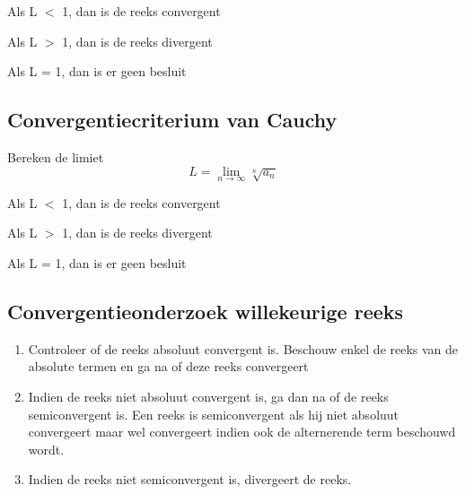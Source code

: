 \documentclass{report}
\begin{document}
Als L $<$ 1, dan is de reeks convergent

Als L $>$ 1, dan is de reeks divergent

Als L = 1, dan is er geen besluit
\subsection*{Convergentiecriterium van Cauchy}
Bereken de limiet
$$L = \lim\limits_{n\to\infty} \sqrt[n]{a_n}$$

Als L $<$ 1, dan is de reeks convergent

Als L $>$ 1, dan is de reeks divergent

Als L = 1, dan is er geen besluit

\subsection*{Convergentieonderzoek willekeurige reeks}
\begin{enumerate}
 \item Controleer of de reeks absoluut convergent is. Beschouw enkel de reeks van de absolute termen en ga na of deze reeks convergeert
 \item Indien de reeks niet absoluut convergent is, ga dan na of de reeks semiconvergent is. Een reeks is semiconvergent als hij niet absoluut convergeert maar wel convergeert indien ook de alternerende term beschouwd wordt.
 \item Indien de reeks niet semiconvergent is, divergeert de reeks.
\end{enumerate}
\end{document}
